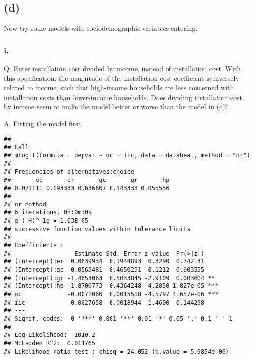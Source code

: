 \documentclass[
]{article}
\newenvironment{Shaded}{\begin{snugshade}}{\end{snugshade}}
\newcommand{\DecValTok}[1]{\textcolor[rgb]{0.00,0.00,0.81}{#1}}
\newcommand{\KeywordTok}[1]{\textcolor[rgb]{0.13,0.29,0.53}{\textbf{#1}}}
\newcommand{\NormalTok}[1]{#1}
\newcommand{\OperatorTok}[1]{\textcolor[rgb]{0.81,0.36,0.00}{\textbf{#1}}}
\newcommand{\StringTok}[1]{\textcolor[rgb]{0.31,0.60,0.02}{#1}}
\begin{document}

\hypertarget{d}{%
\subsection{(d)}\label{d}}

Now try some models with sociodemographic variables entering.

\hypertarget{i.-2}{%
\subsubsection{i.}\label{i.-2}}

Q: Enter installation cost divided by income, instead of installation
cost. With this specification, the magnitude of the installation cost
coefficient is inversely related to income, such that high-income
households are less concerned with installation costs than lower-income
households. Does dividing installation cost by income seem to make the
model better or worse than the model in \protect\hyperlink{onec}{(c)}?


A: Fitting the model first

\begin{Shaded}
\end{Shaded}

\begin{verbatim}
## 
## Call:
## mlogit(formula = depvar ~ oc + iic, data = dataheat, method = "nr")
## 
## Frequencies of alternatives:choice
##       ec       er       gc       gr       hp 
## 0.071111 0.093333 0.636667 0.143333 0.055556 
## 
## nr method
## 6 iterations, 0h:0m:0s 
## g'(-H)^-1g = 1.03E-05 
## successive function values within tolerance limits 
## 
## Coefficients :
##                  Estimate Std. Error z-value  Pr(>|z|)    
## (Intercept):er  0.0639934  0.1944893  0.3290  0.742131    
## (Intercept):gc  0.0563481  0.4650251  0.1212  0.903555    
## (Intercept):gr -1.4653063  0.5033845 -2.9109  0.003604 ** 
## (Intercept):hp -1.8700773  0.4364248 -4.2850 1.827e-05 ***
## oc             -0.0071066  0.0015518 -4.5797 4.657e-06 ***
## iic            -0.0027658  0.0018944 -1.4600  0.144298    
## ---
## Signif. codes:  0 '***' 0.001 '**' 0.01 '*' 0.05 '.' 0.1 ' ' 1
## 
## Log-Likelihood: -1010.2
## McFadden R^2:  0.011765 
## Likelihood ratio test : chisq = 24.052 (p.value = 5.9854e-06)
\end{verbatim}
\end{document}
